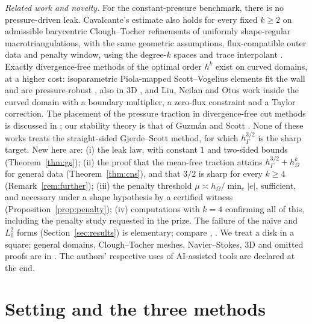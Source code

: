 \documentclass[5p,times]{elsarticle}
\theoremstyle{definition}
\newcommand{\hG}{h_\Gamma}
\newcommand{\hO}{h_\Omega}
\begin{document}
\emph{Related work and novelty.} For the constant-pressure benchmark, there is no pressure-driven leak. Cavalcante's estimate also holds for every fixed $k\ge2$ on admissible barycentric Clough--Tocher refinements of uniformly shape-regular macrotriangulations, with the same geometric assumptions, flux-compatible outer data and penalty window, using the degree-$k$ spaces and trace interpolant \cite[Corollary~5.3]{Cavalcante2026}.
 Exactly divergence-free methods of the optimal order $h^k$ exist on curved domains, at a higher cost: isoparametric Piola-mapped Scott--Vogelius elements fit the wall and are pressure-robust \cite[Theorem~6.1]{NeilanOtus2021}, also in 3D \cite{ChenLiu2026}, and Liu, Neilan and Otus \cite{LiuNeilanOtus2023} work inside the curved domain with a boundary multiplier, a zero-flux constraint and a Taylor correction. The placement of the pressure traction in divergence-free cut methods is discussed in \cite{LiuNeilanOlshanskii2023,FrachonNilssonZahedi2024}; our stability theory is that of Guzm\'an and Scott \cite{GuzmanScott2019}. None of these works treats the straight-sided Gjerde--Scott method, for which $\hG^{3/2}$ is the sharp target. New here are: (i) the leak law, with constant $1$ and two-sided bounds (Theorem~\ref{thm:gs}); (ii) the proof that the mean-free traction attains $\hG^{3/2}+\hO^k$ for general data (Theorem~\ref{thm:cns}), and that $3/2$ is sharp for every $k\ge4$ (Remark~\ref{rem:further}); (iii) the penalty threshold $\mu\asymp\hO/\min_e|e|$, sufficient, and necessary under a shape hypothesis by a certified witness (Proposition~\ref{prop:penalty}); (iv) computations with $k=4$ confirming all of this, including the penalty study requested in the prize. The failure of the naive and $L^2_0$ forms (Section~\ref{sec:results}) is elementary; compare \cite[(5.7)--(5.9)]{FrachonNilssonZahedi2024}, \cite[Remark~3.2]{LiuNeilanOtus2023}. We treat a disk in a square; general domains, Clough--Tocher meshes, Navier--Stokes, 3D and omitted proofs are in \cite{PadhiExt}. The authors' respective uses of AI-assisted tools are declared at the end.

\section{Setting and the three methods}\label{sec:setting}
\end{document}
